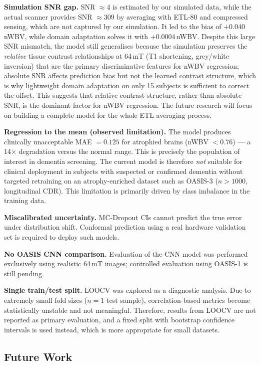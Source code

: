 \documentclass{ieeeaccess}
\begin{document}
\textbf{Simulation SNR gap.} SNR $\approx 4$ is estimated by our simulated
data, while the actual scanner provides SNR $\approx 309$ by averaging with
ETL-80 and compressed sensing, which are not captured by our simulation. It
led to the bias of $+0.040$\,nWBV, while domain adaptation solves it with
$+0.0004$\,nWBV. Despite this large SNR mismatch, the model still generalises
because the simulation preserves the \emph{relative} tissue contrast
relationships at 64\,mT (T1 shortening, grey/white inversion) that are the
primary discriminative features for nWBV regression; absolute SNR affects
prediction bias but not the learned contrast structure, which is why
lightweight domain adaptation on only 15 subjects is sufficient to correct
the offset. This suggests that relative contrast structure, rather than
absolute SNR, is the dominant factor for nWBV regression. The future research will focus on building a complete model
for the whole ETL averaging process.

\textbf{Regression to the mean (observed limitation).}
The model produces clinically unacceptable MAE $= 0.125$ for atrophied
brains (nWBV $< 0.76$) --- a 14$\times$ degradation versus the normal range.
This is precisely the population of interest in dementia screening.
The current model is therefore \emph{not} suitable for clinical deployment
in subjects with suspected or confirmed dementia without targeted retraining
on an atrophy-enriched dataset such as OASIS-3 ($n > 1000$, longitudinal CDR).
This limitation is primarily driven by class imbalance in the training data.

\textbf{Miscalibrated uncertainty.} MC-Dropout CIs cannot predict the true
error under distribution shift. Conformal prediction using a real hardware
validation set is required to deploy such models.

\textbf{No OASIS CNN comparison.} Evaluation of the CNN model was performed
exclusively using realistic 64\,mT images; controlled evaluation using
OASIS-1 is still pending.

\textbf{Single train/test split.} LOOCV was explored as a diagnostic
analysis. Due to extremely small fold sizes ($n=1$ test sample), correlation-based
metrics become statistically unstable and not meaningful. Therefore, results
from LOOCV are not reported as primary evaluation, and a fixed split with
bootstrap confidence intervals is used instead, which is more appropriate
for small datasets.

\subsection{Future Work}
\end{document}
